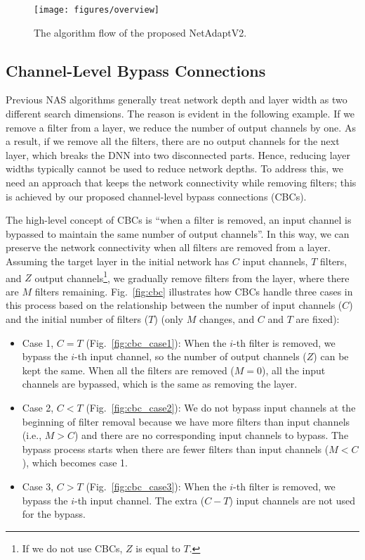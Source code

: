 \begin{figure*}[t]
\begin{center}
   \texttt{[image: figures/overview]}
\end{center}
\vspace{-2mm}
   \caption{The algorithm flow of the proposed NetAdaptV2.}
\label{fig:overview}
\end{figure*}




\subsection{Channel-Level Bypass Connections}
\label{subsec:channel_level_bypass_connections}

Previous NAS algorithms generally treat network depth and layer width as two different search dimensions. The reason is evident in the following example. If we remove a filter from a layer, we reduce the number of output channels by one. As a result, if we remove all the filters, there are no output channels for the next layer, which breaks the DNN into two disconnected parts. Hence, reducing layer widths typically cannot be used to reduce network depths. To address this, we need an approach that keeps the network connectivity while removing filters; this is achieved by our proposed channel-level bypass connections (CBCs).

The high-level concept of CBCs is ``when a filter is removed, an input channel is bypassed to maintain the same number of output channels''. In this way, we can preserve the network connectivity when all filters are removed from a layer. Assuming the target layer in the initial network has $C$ input channels, $T$ filters, and $Z$ output channels\footnote{If we do not use CBCs, $Z$ is equal to $T$.}, we gradually remove filters from the layer, where there are $M$ filters remaining. Fig.~\ref{fig:cbc} illustrates how CBCs handle three cases in this process based on the relationship between the number of input channels ($C$) and the initial number of filters ($T$) (only $M$ changes, and $C$ and $T$ are fixed):
\begin{itemize}
    \item Case 1, $C = T$ (Fig.~\ref{fig:cbc_case1}): When the $i$-th filter is removed, we bypass the $i$-th input channel, so the number of output channels ($Z$) can be kept the same. When all the filters are removed ($M = 0$), all the input channels are bypassed, which is the same as removing the layer.
    \item Case 2, $C < T$ (Fig.~\ref{fig:cbc_case2}): We do not bypass input channels at the beginning of filter removal because we have more filters than input channels (i.e., $M > C$) and there are no corresponding input channels to bypass. The bypass process starts when there are fewer filters than input channels ($M < C$), which becomes case 1.
    \item Case 3, $C > T$ (Fig.~\ref{fig:cbc_case3}): When the $i$-th filter is removed, we bypass the $i$-th input channel. The extra ($C-T$) input channels are not used for the bypass.
\end{itemize}


